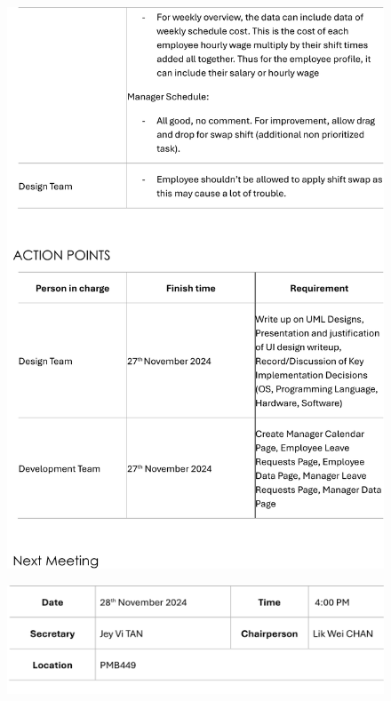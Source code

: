 \documentclass[a4paper,12pt, oneside]{report}
\begin{document}
\begin{appendices}
\begin{figure}[H]
    \includegraphics[width=\textwidth]{Minutes/Minutes_6-cropped-2.png}
\end{figure}
\newpage
\begin{figure}[H]
    \centering
    \includegraphics[width=\textwidth]{Minutes/Minutes_6-cropped-3.png}
\end{figure}

\end{appendices}
\end{document}
